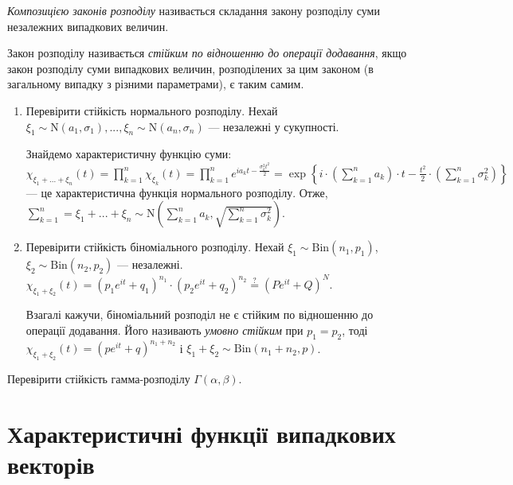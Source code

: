 \begin{definition}
    \emph{Композицією законів розподілу} називається складання закону розподілу суми незалежних випадкових величин.
    
    Закон розподілу називається \emph{стійким по відношенню до операції додавання},
    якщо закон розподілу суми випадкових величин, розподілених за цим законом (в загальному випадку з різними параметрами),
    є таким самим.
\end{definition}
\begin{example}
    \begin{enumerate}
        \item Перевірити стійкість нормального розподілу. Нехай $\xi_1 \sim \mathrm{N}(a_1, \sigma_1), ..., \xi_n \sim \mathrm{N}(a_n, \sigma_n)$ ---
        незалежні у сукупності. 
    
        Знайдемо характеристичну функцію суми: $\chi_{\xi_1 + ... + \xi_n}(t) = \prod\limits_{k=1}^n \chi_{\xi_k}(t)=
        \prod\limits_{k=1}^n e^{ia_k t - \frac{\sigma_k^2 t^2}{2}} = 
        \exp\left\{i\cdot \left( \sum\limits_{k=1}^n a_k\right)\cdot t - \frac{t^2}{2}\cdot\left( \sum\limits_{k=1}^n \sigma_k^2\right)\right\}$ ---
        це характеристична функція нормального розподілу. Отже, $\sum\limits_{k=1}^n = \xi_1 + ... + \xi_n \sim \mathrm{N}\left(\sum\limits_{k=1}^n a_k,  \sqrt{\sum\limits_{k=1}^n \sigma_k^2}\right)$.
        \item Перевірити стійкість біноміального розподілу. Нехай $\xi_1 \sim \mathrm{Bin}(n_1, p_1)$, $\xi_2 \sim \mathrm{Bin}(n_2, p_2)$ --- незалежні.
        $\chi_{\xi_1 + \xi_2} (t) = \left( p_1 e^{it} + q_1\right)^{n_1} \cdot \left( p_2 e^{it} + q_2\right)^{n_2} \overset{?}{=} \left(P e^{it} + Q\right)^N$.

        Взагалі кажучи, біноміальний розподіл не є стійким по відношенню до  операції додавання.
        Його називають \emph{умовно стійким} при $p_1 = p_2$, тоді
        $\chi_{\xi_1 + \xi_2} (t) = \left( p e^{it} + q\right)^{n_1 + n_2}$ і $\xi_1 + \xi_2 \sim \mathrm{Bin}(n_1+n_2, p)$.
    \end{enumerate}
\end{example}

\begin{exercise}
    Перевірити стійкість гамма-розподілу $\Gamma(\alpha, \beta)$.
\end{exercise}

\section{Характеристичні функції випадкових векторів}
